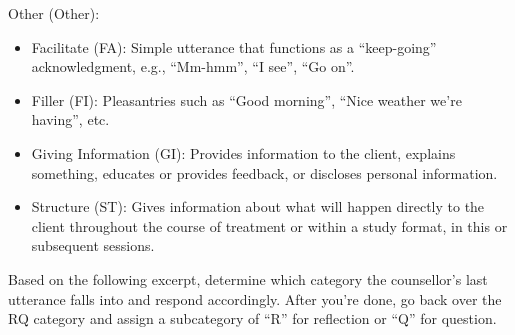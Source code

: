 \begin{tcolorbox}
	Other (Other):
	\begin{itemize}[itemsep=0pt, parsep=0pt]
            \item Facilitate (FA): Simple utterance that functions as a ``keep-going'' acknowledgment, e.g., ``Mm-hmm'', ``I see'', ``Go on''.
            \item Filler (FI): Pleasantries such as ``Good morning'', ``Nice weather we're having'', etc.
		\item Giving Information (GI): Provides information to the client, explains something, educates or provides feedback, or discloses personal information.
		\item Structure (ST): Gives information about what will happen directly to the client throughout the course of treatment or within a study format, in this or subsequent sessions.
	\end{itemize}

    Based on the following excerpt, determine which category the counsellor's last utterance falls into and respond accordingly. After you're done, go back over the RQ category and assign a subcategory of ``R'' for reflection or ``Q'' for question.
\end{tcolorbox}



